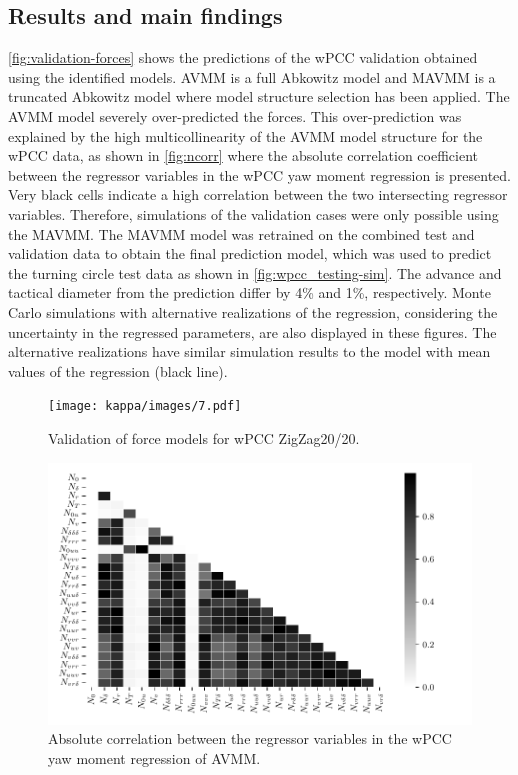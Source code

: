 \subsection*{Results and main findings}
\autoref{fig:validation-forces} shows the predictions of the wPCC validation obtained using the identified models. AVMM is a full Abkowitz model and MAVMM is a truncated Abkowitz model where model structure selection has been applied. The AVMM model severely over-predicted the forces. 
This over-prediction was explained by the high multicollinearity of the AVMM model structure for the wPCC data, as shown in \autoref{fig:ncorr}  where the absolute correlation coefficient between the regressor variables in the wPCC yaw moment regression is presented. Very black cells indicate a high correlation between the two intersecting regressor variables.
Therefore, simulations of the validation cases were only possible using the MAVMM. 
The MAVMM model was retrained on the combined test and validation data to obtain the final prediction model, which was used to predict the turning circle test data as shown in \autoref{fig:wpcc_testing-sim}. The advance and tactical diameter \cite{imoStandardsShipManoeuvrability2002} from the prediction differ by 4\% and 1\%, respectively. Monte Carlo simulations with alternative realizations of the regression, considering the uncertainty in the regressed parameters, are also displayed in these figures. The alternative realizations have similar simulation results to the model with mean values of the regression (black line).
\begin{figure}[h]
\centering
\texttt{[image: kappa/images/7.pdf]}
\caption{Validation of force models for wPCC ZigZag20/20.}\label{fig:validation-forces}
\end{figure}
\begin{figure}[h]
\centering
\includegraphics[width=1.0\textwidth]{kappa/images/10.pdf}

    \caption{Absolute correlation between the regressor variables in the wPCC yaw moment regression of AVMM.}

\label{fig:ncorr}
\end{figure}
